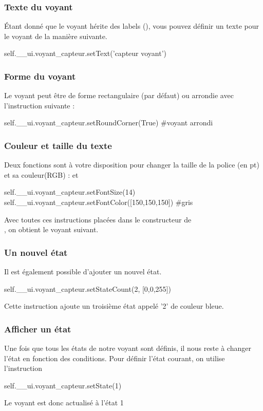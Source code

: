 \documentclass[12pt]{report}    %
\begin{document}
\subsubsection{Texte du voyant}

Étant donné que le voyant hérite des labels (), vous pouvez définir un texte pour le voyant de la manière suivante.

\begin{pyCode}
self.__ui.voyant_capteur.setText('capteur voyant')
\end{pyCode}


\subsubsection{Forme du voyant}

Le voyant peut être de forme rectangulaire (par défaut) ou arrondie avec l'instruction suivante :

\begin{pyCode}
self.__ui.voyant_capteur.setRoundCorner(True) #voyant arrondi
\end{pyCode}

\subsubsection{Couleur et taille du texte}

Deux fonctions sont à votre disposition pour changer la taille de la police (en pt) et sa couleur(RGB) :  et 
\begin{pyCode}
self.__ui.voyant_capteur.setFontSize(14)
self.__ui.voyant_capteur.setFontColor([150,150,150]) #gris
\end{pyCode}

Avec toutes ces instructions placées dans le constructeur de \\ , on obtient le voyant suivant.


\subsubsection{Un nouvel état}
Il est également possible d'ajouter un nouvel état.
\begin{pyCode}
self.__ui.voyant_capteur.setStateCount(2, [0,0,255]) 
\end{pyCode}
Cette instruction ajoute un troisième état appelé '2' de couleur bleue.

\subsubsection{Afficher un état}

Une fois que tous les états de notre voyant sont définis, il nous reste à changer l'état en fonction des conditions.
Pour définir l'état courant, on utilise l'instruction 
\begin{pyCode}
self.__ui.voyant_capteur.setState(1) 
\end{pyCode}
Le voyant est donc actualisé à l'état 1
\end{document}
